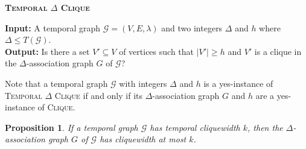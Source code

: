 \documentclass[preprint,12pt]{elsarticle}
\makeatletter
\newtheorem{prop}{Proposition}
\newcommand{\decisionproblem}[3]{%
\begin{framed}
\vspace{0,1cm} \noindent
 \textbf{\textsc{#1} }
\par%
\noindent
{\bf{Input:}}  #2\\%
{\bf{Output:}} #3%
\end{framed}
}
\makeatother
\begin{document}
\newpage

\decisionproblem{Temporal $\Delta$ Clique}{A temporal graph $\mathcal{G}=(V,E,\lambda)$ and two integers $\Delta$ and $h$ where $\Delta\leq T(\mathcal{G})$.}{Is there a set $V'\subseteq V$ of vertices such that $|V'|\geq h$ and $V'$ is a clique in the $\Delta$-association graph $G$ of $\mathcal{G}$?}

Note that a temporal graph $\mathcal{G}$ with integers $\Delta$ and $h$ is a yes-instance of \textsc{Temporal $\Delta$ Clique} if and only if its $\Delta$-association graph $G$ and $h$ are a yes-instance of \textsc{Clique}.
\begin{prop}
     If a temporal graph $\mathcal{G}$ has temporal cliquewidth $k$, then the $\Delta$-association graph $G$ of $\mathcal{G}$ has cliquewidth at most $k$.
\end{prop}
\end{document}
